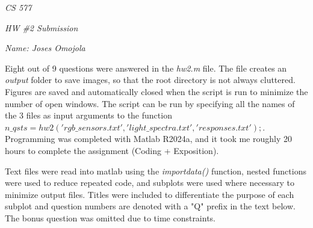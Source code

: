 \documentclass[12pt]{report}
\begin{document}
\centerline{\it CS 577}
\centerline{\it HW \#2 Submission}
\centerline{\it Name: Joses Omojola}

Eight out of 9 questions were answered in the \emph{hw2.m} file. The file creates an \emph{output} folder to save images, 
so that the root directory is not always cluttered. Figures are saved and automatically closed when the script is run to
minimize the number of open windows. The script can be run by specifying all the names of the 3 files as input arguments 
to the function $ n\_qsts = hw2('rgb\_sensors.txt','light\_spectra.txt','responses.txt');$. Programming was completed with 
Matlab R2024a, and it took me roughly 20 hours to complete the assignment (Coding + Exposition).

Text files were read into matlab using the \emph{importdata()} function, nested functions were used to reduce repeated 
code, and subplots were used where necessary to minimize output files. Titles were included to differentiate the purpose 
of each subplot and question numbers are denoted with a "Q" prefix in the text below. The bonus question was omitted due 
to time constraints.
\end{document}
